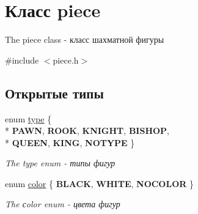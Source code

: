 \hypertarget{classpiece}{}\section{Класс piece}
\label{classpiece}


The piece class -\/ класс шахматной фигуры  




{\ttfamily \#include $<$piece.\+h$>$}

\subsection*{Открытые типы}
\begin{DoxyCompactItemize}
\item 
\hypertarget{classpiece_a60bdcec91f595c164fe08c6705f192d0}{}enum \hyperlink{classpiece_a60bdcec91f595c164fe08c6705f192d0}{type} \{ \\*
{\bfseries P\+A\+W\+N}, 
{\bfseries R\+O\+O\+K}, 
{\bfseries K\+N\+I\+G\+H\+T}, 
{\bfseries B\+I\+S\+H\+O\+P}, 
\\*
{\bfseries Q\+U\+E\+E\+N}, 
{\bfseries K\+I\+N\+G}, 
{\bfseries N\+O\+T\+Y\+P\+E}
 \}\label{classpiece_a60bdcec91f595c164fe08c6705f192d0}

\begin{DoxyCompactList}\small\item\em The type enum -\/ типы фигур \end{DoxyCompactList}\item 
\hypertarget{classpiece_a0e121e5952345fd0e7014a8e6a1fbbda}{}enum \hyperlink{classpiece_a0e121e5952345fd0e7014a8e6a1fbbda}{color} \{ {\bfseries B\+L\+A\+C\+K}, 
{\bfseries W\+H\+I\+T\+E}, 
{\bfseries N\+O\+C\+O\+L\+O\+R}
 \}\label{classpiece_a0e121e5952345fd0e7014a8e6a1fbbda}

\begin{DoxyCompactList}\small\item\em The сolor enum -\/ цвета фигур \end{DoxyCompactList}\end{DoxyCompactItemize}
